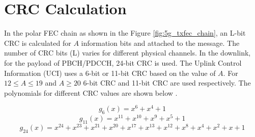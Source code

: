 \section{CRC Calculation}
In the polar FEC chain as shown in the Figure \ref{fig:5g_txfec_chain}, an L-bit CRC is calculated for $A$ information bits and attached to the message. The number of CRC bits (L) varies for different physical channels. In the downlink, for the payload of PBCH/PDCCH, 24-bit CRC is used. The Uplink Control Information (UCI) uses a 6-bit or 11-bit CRC based on the value of $A$. For $12 \leq A \leq 19$ and $A \geq 20$ 6-bit CRC and 11-bit CRC are used respectively. The polynomials for different CRC values are shown below \cite{3gpp.38.212}.

\begin{equation} \label{crc_polynomial6}
g_{6}(x) = x^{6} + x^{4} + 1
\end{equation}
\begin{equation} \label{crc_polynomial11}
g_{11}(x) = x^{11} + x^{10} + x^{9} + x^{5} + 1
\end{equation}
\begin{equation} \label{crc_polynomial24}
g_{24}(x) = x^{24} + x^{23} + x^{21} + x^{20} + x^{17} + x^{13} + x^{12} + x^{8} + x^{4} + x^{2} + x + 1
\end{equation}


